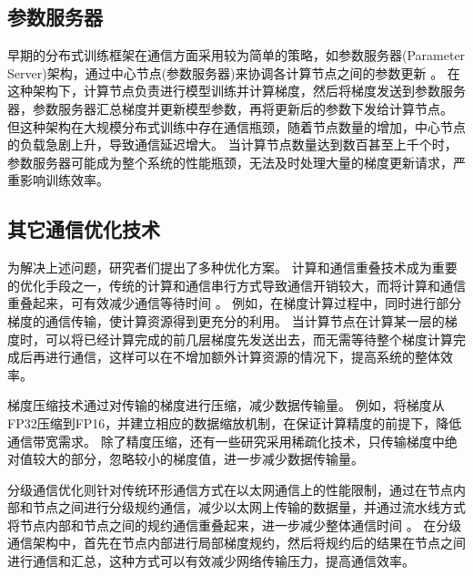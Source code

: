 \subsection{参数服务器}

早期的分布式训练框架在通信方面采用较为简单的策略，如参数服务器(Parameter Server)架构，通过中心节点(参数服务器)来协调各计算节点之间的参数更新 \cite{li2014communication}。
在这种架构下，计算节点负责进行模型训练并计算梯度，然后将梯度发送到参数服务器，参数服务器汇总梯度并更新模型参数，再将更新后的参数下发给计算节点。
但这种架构在大规模分布式训练中存在通信瓶颈，随着节点数量的增加，中心节点的负载急剧上升，导致通信延迟增大。
当计算节点数量达到数百甚至上千个时，参数服务器可能成为整个系统的性能瓶颈，无法及时处理大量的梯度更新请求，严重影响训练效率。

\subsection{其它通信优化技术}

为解决上述问题，研究者们提出了多种优化方案。
计算和通信重叠技术成为重要的优化手段之一，传统的计算和通信串行方式导致通信开销较大，而将计算和通信重叠起来，可有效减少通信等待时间 \cite{flux,zhai2023smartmoe, wang2024hiding}。
例如，在梯度计算过程中，同时进行部分梯度的通信传输，使计算资源得到更充分的利用。
当计算节点在计算某一层的梯度时，可以将已经计算完成的前几层梯度先发送出去，而无需等待整个梯度计算完成后再进行通信，这样可以在不增加额外计算资源的情况下，提高系统的整体效率。

梯度压缩技术通过对传输的梯度进行压缩，减少数据传输量\cite{jiasdp4bit, feng2024accelerating}。
例如，将梯度从FP32压缩到FP16，并建立相应的数据缩放机制，在保证计算精度的前提下，降低通信带宽需求。
除了精度压缩，还有一些研究采用稀疏化技术，只传输梯度中绝对值较大的部分，忽略较小的梯度值，进一步减少数据传输量。

分级通信优化则针对传统环形通信方式在以太网通信上的性能限制，通过在节点内部和节点之间进行分级规约通信，减少以太网上传输的数据量，并通过流水线方式将节点内部和节点之间的规约通信重叠起来，进一步减少整体通信时间 \cite{he2021fastmoe}。
在分级通信架构中，首先在节点内部进行局部梯度规约，然后将规约后的结果在节点之间进行通信和汇总，这种方式可以有效减少网络传输压力，提高通信效率。



